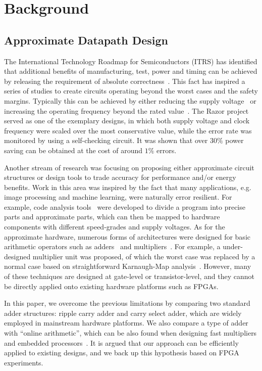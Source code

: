 \documentclass[10pt, conference, compsocconf]{IEEEtran}
\begin{document}
\section{Background}\label{sec:Background}
\subsection{Approximate Datapath Design}
The International Technology Roadmap for Semiconductors (ITRS) has identified that additional benefits of manufacturing, test, power and timing can be achieved by releasing the requirement of absolute correctness~\cite{semiconductor2007international}. This fact has inspired a series of studies to create circuits operating beyond the worst cases and the safety margins. Typically this can be achieved by either reducing the supply voltage~\cite{NonUniformScaling} or increasing the operating frequency beyond the rated value~\cite{SKfccm13,JoshFCCM2012}. The Razor project~\cite{Razor2004} served as one of the exemplary designs, in which both supply voltage and clock frequency were scaled over the most conservative value, while the error rate was monitored by using a self-checking circuit. It was shown that over $30\%$ power saving can be obtained at the cost of around $1\%$ errors.

Another stream of research was focusing on proposing either approximate circuit structures or design tools to trade accuracy for performance and/or energy benefits. Work in this area was inspired by the fact that many applications, e.g. image processing and machine learning, were naturally error resilient. For example, code analysis tools~\cite{Truffle2012Uwash,EnerJ2011Uwash} were developed to divide a program into precise parts and approximate parts, which can then be mapped to hardware components with different speed-grades and supply voltages. As for the approximate hardware, numerous forms of architectures were designed for basic arithmetic operators such as adders~\cite{ApproximateAdderTC} and multipliers~\cite{ApproximateMultDATE}. For example, a under-designed multiplier unit was proposed, of which the worst case was replaced by a normal case based on straightforward Karnaugh-Map analysis~\cite{Undersigned2x2multiplier}. However, many of these techniques are designed at gate-level or transistor-level, and they cannot be directly applied onto existing hardware platforms such as FPGAs.

In this paper, we overcome the previous limitations by comparing two standard adder structures: ripple carry adder and carry select adder, which are widely employed in mainstream hardware platforms. We also compare a type of adder with ``online arithmetic'', which can be also found when designing fast multipliers and embedded processors~\cite{RedundantMult_1987}. It is argued that our approach can be efficiently applied to existing designs, and we back up this hypothesis based on FPGA experiments.
\end{document}
